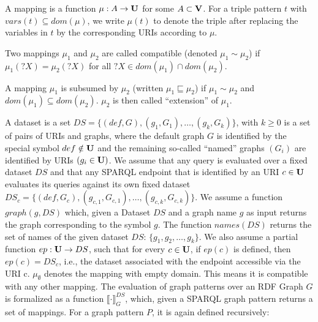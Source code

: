 \begin{definition}
	A mapping is a function $\mu: A \rightarrow  \mathbf{U}$ for some $A \subset \mathbf{V}$. 
	For a triple pattern $t$ with $vars(t) \subseteq dom(\mu)$, we write $\mu(t)$ to 
	denote the triple after replacing the variables in $t$ by the corresponding 
	URIs according to $\mu$. 

	\noindent Two mappings $\mu_1$ and $\mu_2$ are called compatible (denoted $\mu_1 \sim \mu_2$) 
	if $\mu_1(?X) = \mu_2(?X)$ for all $?X \in dom(\mu_1) \cap dom(\mu_2)$.

	\noindent A mapping $\mu_1$ is subsumed by $\mu_2$ (written $\mu_1 \sqsubseteq \mu_2$) 
	if $\mu_1 \sim \mu_2$ and $dom(\mu_1) \subseteq dom(\mu_2)$. $\mu_2$ is then called ``extension'' of $\mu_1$.

	A dataset is a set $DS = \{(def, G), (g_1,G_1), \dots, (g_k, G_k) \}$, with
	$k\geq 0$ is a set of pairs of URIs and graphs,
	where the default graph $G$ is identified by the special symbol $def \notin \mathbf{U}$
	and the remaining so-called ``named'' graphs $(G_i)$ are identified by URIs
	$(g_i \in \mathbf{U})$. We assume that any query is evaluated over a fixed dataset $DS$
	and that any SPARQL endpoint that is identified by an URI $c \in \mathbf{U}$ evaluates
	its queries against its own fixed dataset 
	$DS_c = \{ (def, G_c),(g_{c,1},G_{c,1}), \dots, (g_{c,k},G_{c,k})\}$.
	We assume a function $graph(g,DS)$ which, given a Dataset $DS$ and a graph name $g$ as
	input returns the graph corresponding to the symbol $g$. The function
	$names(DS)$ returns the set of names of the given dataset $DS$:
	$\{g_1,g_2,\dots,g_k\}$.
	We also assume a partial function $ep: \mathbf{U} \rightarrow DS$, such that for every $c \in
	\mathbf{U}$, if $ep(c)$ is defined, then $ep(c) = DS_c$, i.e., the dataset associated with
	the endpoint accessible via the URI c.
	$\mu_\emptyset$ denotes the mapping with empty domain. This means it is
	compatible with any other mapping.
	The evaluation of graph patterns over an RDF Graph $G$ is formalized as a
	function  $\llbracket \cdot \rrbracket_G^{DS}$, which, given a SPARQL graph pattern
	returns a set of mappings.
	For a graph pattern $P$, it is again defined recursively:
\end{definition}
